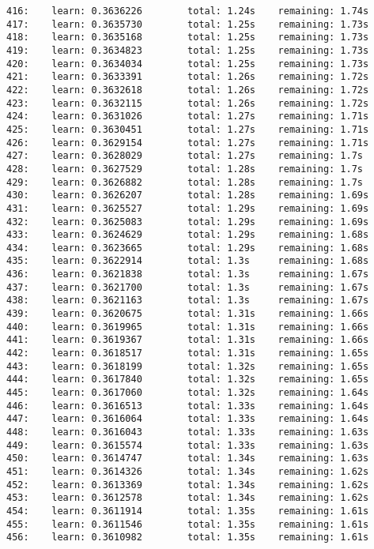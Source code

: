 \documentclass[11pt]{article}
\begin{document}
\begin{Verbatim}[commandchars=\\\{\}]
416:    learn: 0.3636226        total: 1.24s    remaining: 1.74s
417:    learn: 0.3635730        total: 1.25s    remaining: 1.73s
418:    learn: 0.3635168        total: 1.25s    remaining: 1.73s
419:    learn: 0.3634823        total: 1.25s    remaining: 1.73s
420:    learn: 0.3634034        total: 1.25s    remaining: 1.73s
421:    learn: 0.3633391        total: 1.26s    remaining: 1.72s
422:    learn: 0.3632618        total: 1.26s    remaining: 1.72s
423:    learn: 0.3632115        total: 1.26s    remaining: 1.72s
424:    learn: 0.3631026        total: 1.27s    remaining: 1.71s
425:    learn: 0.3630451        total: 1.27s    remaining: 1.71s
426:    learn: 0.3629154        total: 1.27s    remaining: 1.71s
427:    learn: 0.3628029        total: 1.27s    remaining: 1.7s
428:    learn: 0.3627529        total: 1.28s    remaining: 1.7s
429:    learn: 0.3626882        total: 1.28s    remaining: 1.7s
430:    learn: 0.3626207        total: 1.28s    remaining: 1.69s
431:    learn: 0.3625527        total: 1.29s    remaining: 1.69s
432:    learn: 0.3625083        total: 1.29s    remaining: 1.69s
433:    learn: 0.3624629        total: 1.29s    remaining: 1.68s
434:    learn: 0.3623665        total: 1.29s    remaining: 1.68s
435:    learn: 0.3622914        total: 1.3s     remaining: 1.68s
436:    learn: 0.3621838        total: 1.3s     remaining: 1.67s
437:    learn: 0.3621700        total: 1.3s     remaining: 1.67s
438:    learn: 0.3621163        total: 1.3s     remaining: 1.67s
439:    learn: 0.3620675        total: 1.31s    remaining: 1.66s
440:    learn: 0.3619965        total: 1.31s    remaining: 1.66s
441:    learn: 0.3619367        total: 1.31s    remaining: 1.66s
442:    learn: 0.3618517        total: 1.31s    remaining: 1.65s
443:    learn: 0.3618199        total: 1.32s    remaining: 1.65s
444:    learn: 0.3617840        total: 1.32s    remaining: 1.65s
445:    learn: 0.3617060        total: 1.32s    remaining: 1.64s
446:    learn: 0.3616513        total: 1.33s    remaining: 1.64s
447:    learn: 0.3616064        total: 1.33s    remaining: 1.64s
448:    learn: 0.3616043        total: 1.33s    remaining: 1.63s
449:    learn: 0.3615574        total: 1.33s    remaining: 1.63s
450:    learn: 0.3614747        total: 1.34s    remaining: 1.63s
451:    learn: 0.3614326        total: 1.34s    remaining: 1.62s
452:    learn: 0.3613369        total: 1.34s    remaining: 1.62s
453:    learn: 0.3612578        total: 1.34s    remaining: 1.62s
454:    learn: 0.3611914        total: 1.35s    remaining: 1.61s
455:    learn: 0.3611546        total: 1.35s    remaining: 1.61s
456:    learn: 0.3610982        total: 1.35s    remaining: 1.61s

\end{Verbatim}
\end{document}
